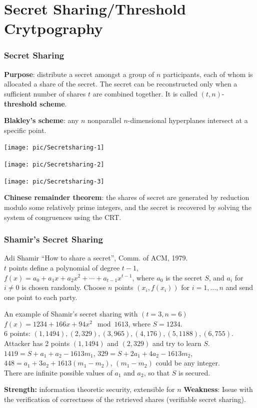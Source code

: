 \section{Secret Sharing/Threshold Crytpography}
\begin{frame}\frametitle{Secret Sharing}
\textbf{Purpose}: distribute a secret amongst a group of $n$ participants, each of whom is allocated a share of the secret. The secret can be reconstructed only when a sufficient number of shares $t$ are combined together. It is called $(t, n)$-\textbf{threshold scheme}.
\newline

\textbf{Blakley's scheme}: any $n$ nonparallel $n$-dimensional hyperplanes intersect at a specific point.

  \begin{minipage}[t]{0.32\linewidth} 
    \centering 
    \texttt{[image: pic/Secretsharing-1]} 
  \end{minipage}%
  \begin{minipage}[t]{0.32\linewidth} 
    \centering 
    \texttt{[image: pic/Secretsharing-2]} 
  \end{minipage}
  \begin{minipage}[t]{0.32\linewidth} 
    \centering 
    \texttt{[image: pic/Secretsharing-3]}  
  \end{minipage} 

\textbf{Chinese remainder theorem}: the shares of secret are generated by reduction modulo some relatively prime integers, and the secret is recovered by solving the system of congruences using the CRT.
\end{frame}
\begin{frame}\frametitle{Shamir's Secret Sharing}
Adi Shamir ``How to share a secret'', Comm. of ACM, 1979.\\
$t$ points define a polynomial of degree $t-1$, $f(x) = a_0 + a_1x + a_2x^2 + \cdots + a_{t-1}x^{t-1}$, where $a_0$ is the secret $S$, and $a_i$ for $i \neq 0$ is chosen randomly. Choose $n$ points $(x_i, f(x_i))$ for $i = 1, \dots, n$ and send one point to each party.
\begin{exampleblock}{An example of Shamir's secret sharing with $(t=3, n=6)$}
$f(x)= 1234 + 166x + 94x^2 \mod 1613$, where $S = 1234$.\\
6 points: $(1, 1494), (2, 329), (3, 965), (4, 176), (5, 1188), (6, 755)$. \\
Attacker has 2 points $(1, 1494)$ and $(2, 329)$ and try to learn $S$.\\
$1419 = S + a_1 + a_2 - 1613m_1 $, $329 = S + 2a_1 + 4a_2 - 1613m_2$,\\
$448 = a_1 + 3 a_2 + 1613(m_1 - m_2)$, $(m_1-m_2)$ could be any integer.\\
There are infinite possible values of $a_1$ and $a_2$, so that $S$ is secured.
\end{exampleblock}
\textbf{Strength:} information theoretic security, extensible for $n$ 
\textbf{Weakness}: Issue with the verification of correctness of the retrieved shares (verifiable secret sharing).
\end{frame}
